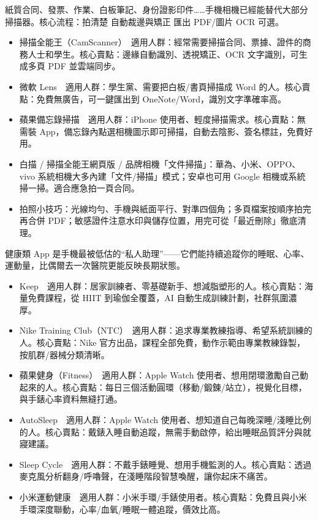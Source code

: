 紙質合同、發票、作業、白板筆記、身份證影印件……手機相機已經能替代大部分掃描器。核心流程：拍清楚 自動裁邊與矯正 匯出 PDF/圖片 OCR 可選。

\begin{itemize}
  \item 掃描全能王（CamScanner）　適用人群：經常需要掃描合同、票據、證件的商務人士和學生。核心賣點：邊緣自動識別、透視矯正、OCR 文字識別，可生成多頁 PDF 並雲端同步。
  \item 微軟 Lens　適用人群：學生黨、需要把白板/書頁掃描成 Word 的人。核心賣點：免費無廣告，可一鍵匯出到 OneNote/Word，識別文字準確率高。
  \item 蘋果備忘錄掃描　適用人群：iPhone 使用者、輕度掃描需求。核心賣點：無需裝 App，備忘錄內點選相機圖示即可掃描，自動去陰影、簽名標註，免費好用。
  \item 白描 / 掃描全能王網頁版 / 品牌相機「文件掃描」：華為、小米、OPPO、vivo 系統相機大多內建「文件/掃描」模式；安卓也可用 Google 相機或系統掃一掃。適合應急拍一頁合同。
  \item 拍照小技巧：光線均勻、手機與紙面平行、對準四個角；多頁檔案按順序拍完再合併 PDF；敏感證件注意水印與儲存位置，用完可從「最近刪除」徹底清理。
\end{itemize}


健康類 App 是手機最被低估的“私人助理”——它們能持續追蹤你的睡眠、心率、運動量，比偶爾去一次醫院更能反映長期狀態。


\begin{itemize}
  \item Keep　適用人群：居家訓練者、零基礎新手、想減脂塑形的人。核心賣點：海量免費課程，從 HIIT 到瑜伽全覆蓋，AI 自動生成訓練計劃，社群氛圍濃厚。
  \item Nike Training Club（NTC）　適用人群：追求專業教練指導、希望系統訓練的人。核心賣點：Nike 官方出品，課程全部免費，動作示範由專業教練錄製，按肌群/器械分類清晰。
  \item 蘋果健身（Fitness）　適用人群：Apple Watch 使用者、想用閉環激勵自己動起來的人。核心賣點：每日三個活動圓環（移動/鍛鍊/站立），視覺化目標，與手錶心率資料無縫打通。
\end{itemize}


\begin{itemize}
  \item AutoSleep　適用人群：Apple Watch 使用者、想知道自己每晚深睡/淺睡比例的人。核心賣點：戴錶入睡自動追蹤，無需手動啟停，給出睡眠品質評分與就寢建議。
  \item Sleep Cycle　適用人群：不戴手錶睡覺、想用手機監測的人。核心賣點：透過麥克風分析翻身/呼嚕聲，在淺睡階段智慧喚醒，讓你起床不痛苦。
  \item 小米運動健康　適用人群：小米手環/手錶使用者。核心賣點：免費且與小米手環深度聯動，心率/血氧/睡眠一體追蹤，價效比高。
\end{itemize}

